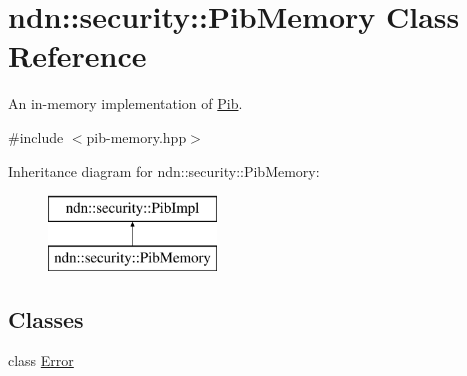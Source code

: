 \hypertarget{classndn_1_1security_1_1PibMemory}{}\section{ndn\+:\+:security\+:\+:Pib\+Memory Class Reference}
\label{classndn_1_1security_1_1PibMemory}


An in-\/memory implementation of \hyperlink{classndn_1_1security_1_1Pib}{Pib}.  




{\ttfamily \#include $<$pib-\/memory.\+hpp$>$}

Inheritance diagram for ndn\+:\+:security\+:\+:Pib\+Memory\+:\begin{figure}[H]
\begin{center}
\leavevmode
\includegraphics[height=2.000000cm]{classndn_1_1security_1_1PibMemory}
\end{center}
\end{figure}
\subsection*{Classes}
\begin{DoxyCompactItemize}
\item 
class \hyperlink{classndn_1_1security_1_1PibMemory_1_1Error}{Error}
\end{DoxyCompactItemize}
